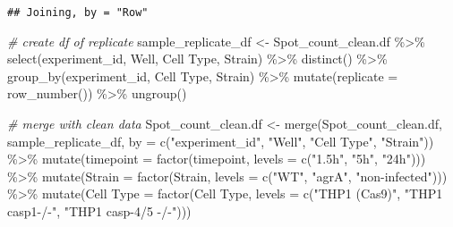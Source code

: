 \documentclass[
]{article}
\newenvironment{Shaded}{\begin{snugshade}}{\end{snugshade}}
\newcommand{\AttributeTok}[1]{\textcolor[rgb]{0.77,0.63,0.00}{#1}}
\newcommand{\CommentTok}[1]{\textcolor[rgb]{0.56,0.35,0.01}{\textit{#1}}}
\newcommand{\FunctionTok}[1]{\textcolor[rgb]{0.00,0.00,0.00}{#1}}
\newcommand{\NormalTok}[1]{#1}
\newcommand{\OtherTok}[1]{\textcolor[rgb]{0.56,0.35,0.01}{#1}}
\newcommand{\SpecialCharTok}[1]{\textcolor[rgb]{0.00,0.00,0.00}{#1}}
\newcommand{\StringTok}[1]{\textcolor[rgb]{0.31,0.60,0.02}{#1}}
\begin{document}
\begin{verbatim}
## Joining, by = "Row"
\end{verbatim}

\begin{Shaded}
\begin{Highlighting}[]
\CommentTok{\# create df of replicate}
\NormalTok{sample\_replicate\_df }\OtherTok{\textless{}{-}}\NormalTok{ Spot\_count\_clean.df }\SpecialCharTok{\%\textgreater{}\%}
  \FunctionTok{select}\NormalTok{(experiment\_id, Well, }\StringTok{\textasciigrave{}}\AttributeTok{Cell Type}\StringTok{\textasciigrave{}}\NormalTok{, Strain) }\SpecialCharTok{\%\textgreater{}\%}
  \FunctionTok{distinct}\NormalTok{() }\SpecialCharTok{\%\textgreater{}\%}
  \FunctionTok{group\_by}\NormalTok{(experiment\_id, }\StringTok{\textasciigrave{}}\AttributeTok{Cell Type}\StringTok{\textasciigrave{}}\NormalTok{, Strain) }\SpecialCharTok{\%\textgreater{}\%}
  \FunctionTok{mutate}\NormalTok{(}\AttributeTok{replicate =} \FunctionTok{row\_number}\NormalTok{()) }\SpecialCharTok{\%\textgreater{}\%}
  \FunctionTok{ungroup}\NormalTok{()}

\CommentTok{\# merge with clean data}
\NormalTok{Spot\_count\_clean.df }\OtherTok{\textless{}{-}} \FunctionTok{merge}\NormalTok{(Spot\_count\_clean.df, sample\_replicate\_df, }\AttributeTok{by =} \FunctionTok{c}\NormalTok{(}\StringTok{"experiment\_id"}\NormalTok{, }\StringTok{"Well"}\NormalTok{, }\StringTok{"Cell Type"}\NormalTok{, }\StringTok{"Strain"}\NormalTok{)) }\SpecialCharTok{\%\textgreater{}\%}
  \FunctionTok{mutate}\NormalTok{(}\AttributeTok{timepoint =} \FunctionTok{factor}\NormalTok{(timepoint, }\AttributeTok{levels =} \FunctionTok{c}\NormalTok{(}\StringTok{"1.5h"}\NormalTok{, }\StringTok{"5h"}\NormalTok{, }\StringTok{"24h"}\NormalTok{))) }\SpecialCharTok{\%\textgreater{}\%}
  \FunctionTok{mutate}\NormalTok{(}\AttributeTok{Strain =} \FunctionTok{factor}\NormalTok{(Strain, }\AttributeTok{levels =} \FunctionTok{c}\NormalTok{(}\StringTok{"WT"}\NormalTok{, }\StringTok{"agrA"}\NormalTok{, }\StringTok{"non{-}infected"}\NormalTok{))) }\SpecialCharTok{\%\textgreater{}\%}
  \FunctionTok{mutate}\NormalTok{(}\StringTok{\textasciigrave{}}\AttributeTok{Cell Type}\StringTok{\textasciigrave{}} \OtherTok{=} \FunctionTok{factor}\NormalTok{(}\StringTok{\textasciigrave{}}\AttributeTok{Cell Type}\StringTok{\textasciigrave{}}\NormalTok{, }\AttributeTok{levels =} \FunctionTok{c}\NormalTok{(}\StringTok{"THP1 (Cas9)"}\NormalTok{, }\StringTok{"THP1 casp1{-}/{-}"}\NormalTok{, }\StringTok{"THP1 casp{-}4/5 {-}/{-}"}\NormalTok{))) }
  

\end{Highlighting}
\end{Shaded}
\end{document}

